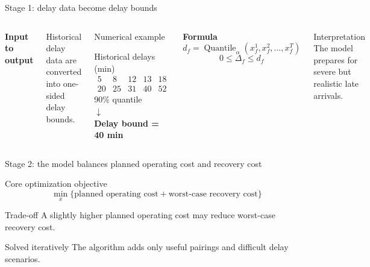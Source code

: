 \documentclass[aspectratio=169,11pt]{beamer}
\begin{document}
\begin{frame}{Stage 1: delay data become delay bounds}
  \begin{columns}[T,onlytextwidth]
      \textbf{Input to output}

      Historical delay data are converted into one-sided delay bounds.

      \vspace{0.20cm}
      \begin{block}{Numerical example}
        \begin{center}
        \small
        Historical delays (min)\\[0.05cm]
        \[
        \begin{array}{rrrrr}
        5 & 8 & 12 & 13 & 18\\
        20 & 25 & 31 & 40 & 52
        \end{array}
        \]
        90\% quantile\\[-0.02cm]
        \(\downarrow\)\\[-0.02cm]
        \textbf{Delay bound = 40 min}
        \end{center}
      \end{block}

      \textbf{Formula}
      \[
        d_f=\operatorname{Quantile}_{\alpha}
        (x_f^1,x_f^2,\ldots,x_f^T)
      \]
      \[
        0\leq \Delta_f \leq d_f
      \]

      \begin{alertblock}{Interpretation}
        The model prepares for severe but realistic late arrivals.
      \end{alertblock}
  \end{columns}
\end{frame}

\begin{frame}{Stage 2: the model balances planned operating cost and recovery cost}
  \begin{center}
  \begin{block}{Core optimization objective}
    \[
      \min_x\{\text{planned operating cost}
      +\text{worst-case recovery cost}\}
    \]
  \end{block}
  \end{center}

  \begin{exampleblock}{Trade-off}
    A slightly higher planned operating cost may reduce worst-case recovery cost.
  \end{exampleblock}

  \begin{alertblock}{Solved iteratively}
    The algorithm adds only useful pairings and difficult delay scenarios.
  \end{alertblock}
\end{frame}
\end{document}
